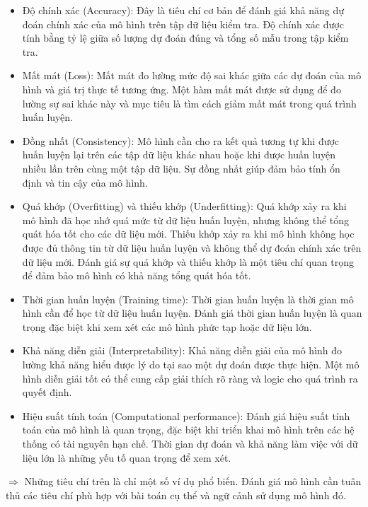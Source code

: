 \begin{itemize}
	\item Độ chính xác (Accuracy): Đây là tiêu chí cơ bản để đánh giá khả năng dự đoán chính xác của mô hình trên tập dữ liệu kiểm tra. Độ chính xác được tính bằng tỷ lệ giữa số lượng dự đoán đúng và tổng số mẫu trong tập kiểm tra.
	
	\item Mất mát (Loss): Mất mát đo lường mức độ sai khác giữa các dự đoán của mô hình và giá trị thực tế tương ứng. Một hàm mất mát được sử dụng để đo lường sự sai khác này và mục tiêu là tìm cách giảm mất mát trong quá trình huấn luyện.
	
	\item Đồng nhất (Consistency): Mô hình cần cho ra kết quả tương tự khi được huấn luyện lại trên các tập dữ liệu khác nhau hoặc khi được huấn luyện nhiều lần trên cùng một tập dữ liệu. Sự đồng nhất giúp đảm bảo tính ổn định và tin cậy của mô hình.
	
	\item Quá khớp (Overfitting) và thiếu khớp (Underfitting): Quá khớp xảy ra khi mô hình đã học nhớ quá mức từ dữ liệu huấn luyện, nhưng không thể tổng quát hóa tốt cho các dữ liệu mới. Thiếu khớp xảy ra khi mô hình không học được đủ thông tin từ dữ liệu huấn luyện và không thể dự đoán chính xác trên dữ liệu mới. Đánh giá sự quá khớp và thiếu khớp là một tiêu chí quan trọng để đảm bảo mô hình có khả năng tổng quát hóa tốt.
	
	\item Thời gian huấn luyện (Training time): Thời gian huấn luyện là thời gian mô hình cần để học từ dữ liệu huấn luyện. Đánh giá thời gian huấn luyện là quan trọng đặc biệt khi xem xét các mô hình phức tạp hoặc dữ liệu lớn.	
	
	\item Khả năng diễn giải (Interpretability): Khả năng diễn giải của mô hình đo lường khả năng hiểu được lý do tại sao một dự đoán được thực hiện. Một mô hình diễn giải tốt có thể cung cấp giải thích rõ ràng và logic cho quá trình ra quyết định.
	
	\item Hiệu suất tính toán (Computational performance): Đánh giá hiệu suất tính toán của mô hình là quan trọng, đặc biệt khi triển khai mô hình trên các hệ thống có tài nguyên hạn chế. Thời gian dự đoán và khả năng làm việc với dữ liệu lớn là những yếu tố quan trọng để xem xét.
\end{itemize}

$\Longrightarrow$ Những tiêu chí trên là chỉ một số ví dụ phổ biến. Đánh giá mô hình cần tuân thủ các tiêu chí phù hợp với bài toán cụ thể và ngữ cảnh sử dụng mô hình đó.



